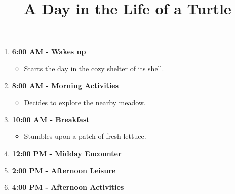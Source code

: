 \documentclass{article}
\title{A Day in the Life of a Turtle}
\date{}
\begin{document}
\maketitle

\begin{enumerate}
\item \textbf{6:00 AM - Wakes up}
\begin{itemize}
\item Starts the day in the cozy shelter of its shell.
\end{itemize}
\item \textbf{8:00 AM - Morning Activities}
\begin{itemize}
\item Decides to explore the nearby meadow.
\end{itemize}
\item \textbf{10:00 AM - Breakfast}
\begin{itemize}
\item Stumbles upon a patch of fresh lettuce.
\end{itemize}
\item \textbf{12:00 PM - Midday Encounter}
\begin{itemize}
\end{itemize}
\item \textbf{2:00 PM - Afternoon Leisure}
\begin{itemize}
\end{itemize}
\item \textbf{4:00 PM - Afternoon Activities}
\begin{itemize}

\end{itemize}
\end{enumerate}
\end{document}
